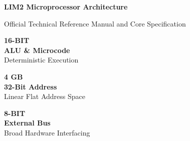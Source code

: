 \documentclass[11pt,a4paper]{article}
\begin{document}
\begin{titlepage}
\vspace*{0.02\textheight}
\noindent
\begin{minipage}[t]{0.8\textwidth}
    
    \vspace{6mm}
    {\fontsize{26}{32}\selectfont\bfseries\color{limwhite}LIM2 Microprocessor Architecture\par}
    \vspace{4mm}
    {\Large\color{limwhite!90}Official Technical Reference Manual and Core Specification\par}
\end{minipage}

\vspace*{0.16\textheight}

\noindent
\begin{minipage}{\textwidth}
    \centering
    \begin{statcard}
        {\large\bfseries\color{limorange}16-BIT}\\[2pt]
        {\footnotesize\bfseries\color{limdark}ALU \& Microcode}\\[2pt]
        {\footnotesize\color{limmuted}Deterministic Execution}
    \end{statcard}\hfill
    \begin{statcard}
        {\large\bfseries\color{limorange}4 GB}\\[2pt]
        {\footnotesize\bfseries\color{limdark}32-Bit Address}\\[2pt]
        {\footnotesize\color{limmuted}Linear Flat Address Space}
    \end{statcard}\hfill
    \begin{statcard}
        {\large\bfseries\color{limorange}8-BIT}\\[2pt]
        {\footnotesize\bfseries\color{limdark}External Bus}\\[2pt]
        {\footnotesize\color{limmuted}Broad Hardware Interfacing}
    \end{statcard}
\end{minipage}

\vfill


\end{titlepage}
\end{document}
